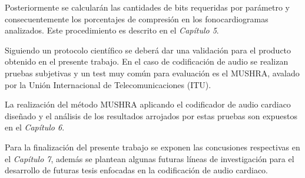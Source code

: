 Posteriormente se calcularán las cantidades de bits requeridas por parámetro y consecuentemente los porcentajes de compresión en los fonocardiogramas analizados. Este procedimiento es descrito en el \emph{Capítulo 5}.

Siguiendo un protocolo científico se deberá dar una validación para el producto obtenido en el presente trabajo. En el caso de codificación de audio se realizan pruebas subjetivas y un test muy común para evaluación es el MUSHRA, avalado por la Unión Internacional de Telecomunicaciones (ITU). 

La realización del método MUSHRA aplicando el codificador de audio cardiaco diseñado y el análisis de los resultados arrojados por estas pruebas son expuestos en el \emph{Capítulo 6}.

Para la finalización del presente trabajo se exponen las concusiones respectivas en el \emph{Capítulo 7}, además se plantean algunas futuras líneas de investigación para el desarrollo de futuras tesis enfocadas en la codificación de audio cardiaco.

